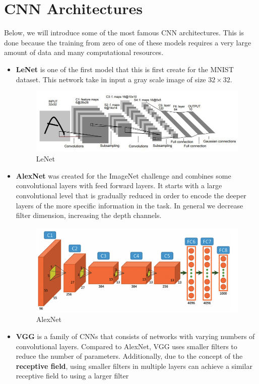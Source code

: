\section{CNN Architectures}
Below, we will introduce some of the most famous CNN architectures. This is done
because the training from zero of one of these models requires a very large amount
of data and many computational resources.
\begin{itemize}
    \item \textbf{LeNet} is one of the first model that this is first create for
          the MNIST dataset. This network take in input a gray scale image of
          size $32 \times 32$.
          \begin{figure}[!ht]
              \centering
              \includegraphics[width=0.4\linewidth]{img/CNN/LeNet-5.jpeg}
              \caption{LeNet}
              \label{fig:lenet}
          \end{figure}
    \item \textbf{AlexNet} was created for the ImageNet challenge and combines
          some convolutional layers with feed forward layers. It starts with a
          large convolutional level that is gradually reduced in order to encode
          the deeper layers of the more specific information in the task. In
          general we decrease filter dimension, increasing the depth channels.
          \begin{figure}[!ht]
              \centering
              \includegraphics[width=0.4\linewidth]{img/CNN/alexNet.png}
              \caption{AlexNet}
              \label{fig:alexnet}
          \end{figure}
    \item \textbf{VGG} is a family of CNNs that consists of networks with varying
          numbers of convolutional layers. Compared to AlexNet, VGG uses smaller
          filters to reduce the number of parameters. Additionally, due to the
          concept of the \textbf{receptive field}, using smaller filters in multiple
          layers can achieve a similar receptive field to using a larger filter

\end{itemize}
